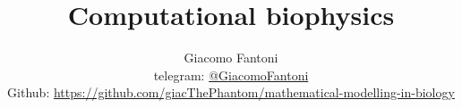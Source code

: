 

\title{\Huge\textbf{{Computational biophysics}}}

\author{
  Giacomo Fantoni \\
  \small telegram: \href{https://t.me/GiacomoFantoni}{@GiacomoFantoni} \\[3pt]
  \small Github: \href{https://github.com/giacThePhantom/mathematical-modelling-in-biology}{https://github.com/giacThePhantom/mathematical-modelling-in-biology}\\
}




  \maketitle
  \tableofcontents
  
  
  
  
  
  
  
  
  
  
  
  
  
  
  
  
  


